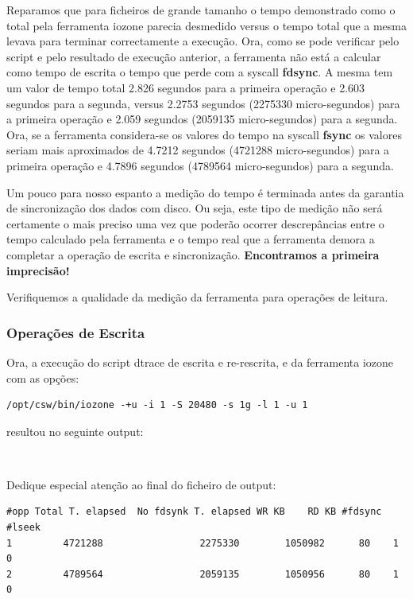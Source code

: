 \documentclass[a4paper]{article}
\begin{document}
{Reparamos que para ficheiros de grande tamanho o tempo demonstrado como o total pela ferramenta iozone parecia desmedido versus o tempo total que a mesma levava para terminar correctamente a execução. Ora, como se pode verificar pelo script e pelo resultado de execução anterior, a ferramenta não está a calcular como tempo de escrita o tempo que perde com a syscall \textbf{fdsync}. A mesma tem um valor de tempo total 2.826 segundos para a primeira operação e 2.603 segundos para a segunda, versus 2.2753 segundos (2275330 micro-segundos) para a primeira operação e 2.059 segundos (2059135 micro-segundos) para a segunda. Ora, se a ferramenta considera-se os valores do tempo na syscall \textbf{fsync} os valores seriam mais aproximados de 4.7212 segundos (4721288 micro-segundos) para a primeira operação e 4.7896 segundos (4789564 micro-segundos) para a segunda. \par 
Um pouco para nosso espanto a medição do tempo é terminada antes da garantia de sincronização dos dados com disco. Ou seja, este tipo de medição não será certamente o mais preciso uma vez que poderão ocorrer descrepâncias entre o tempo calculado pela ferramenta e o tempo real que a ferramenta demora a completar a operação de escrita e sincronização. \textbf{Encontramos a primeira imprecisão!}\par 
\label{imprecisao}
Verifiquemos a qualidade da medição da ferramenta para operações de leitura.

\subsubsection{Operações de Escrita}


Ora, a execução do script dtrace de escrita e re-rescrita, e da ferramenta iozone com as opções:

\begin{lstlisting}[style=command]
/opt/csw/bin/iozone -+u -i 1 -S 20480 -s 1g -l 1 -u 1
\end{lstlisting}

 resultou no seguinte output:

\begin{lstlisting}[style=output]
  

\end{lstlisting}

Dedique especial atenção ao final do ficheiro de output:

\begin{lstlisting}[style=command]
#opp Total T. elapsed  No fdsynk T. elapsed WR KB    RD KB #fdsync  #lseek
1         4721288                 2275330        1050982      80    1    0
2         4789564                 2059135        1050956      80    1    0
\end{lstlisting}




}
\end{document}
